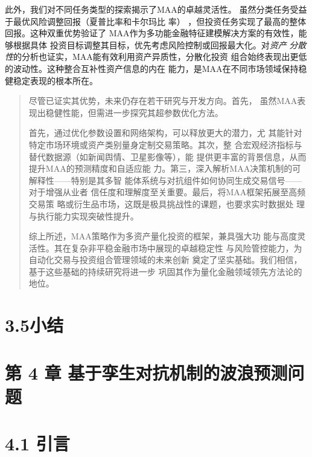 \documentclass[UTF8]{ctexart}
\begin{document}
此外，我们对不同任务类型的探索揭示了MAA的卓越灵活性。
虽然分类任务受益于最优风险调整回报（夏普比率和卡尔玛比 率）
，但投资任务实现了最高的整体回报。这种双重优势验证了
MAA作为多功能金融特征建模解决方案的有效性，能够根据具体
投资目标调整其目标，优先考虑风险控制或回报最大化。对\emph{资产}
\emph{分散性}的分析也证实，MAA能有效利用资产异质性，分散化投资
组合始终表现出更低的波动性。这种整合互补性资产信息的内在
能力，是MAA在不同市场领域保持稳健稳定表现的根本所在。

\begin{quote}
尽管已证实其优势，未来仍存在若干研究与开发方向。首先，
虽然MAA表现出稳健性能，但需进一步探究其超参数优化方法。

首先，通过优化参数设置和网络架构，可以释放更大的潜力，尤
其能针对特定市场环境或资产类别量身定制交易策略。其次，整
合宏观经济指标与替代数据源（如新闻舆情、卫星影像等），能
提供更丰富的背景信息，从而提升MAA的预测精度和自适应能
力。第三，深入解析MAA决策机制的可解释性------特别是其多智
能体系统与对抗组件如何协同生成交易信号------对于增强从业者
信任度和理解度至关重要。最后，将MAA框架拓展至高频交易策
略或衍生品市场，这既是极具挑战性的课题，也要求实时数据处
理与执行能力实现突破性提升。

综上所述，MAA策略作为多资产量化投资的框架，兼具强大功
能与高度灵活性。其在复杂非平稳金融市场中展现的卓越稳定性
与风险管控能力，为自动化交易与投资组合管理领域的未来创新
奠定了坚实基础。我们相信，基于这些基础的持续研究将进一步
巩固其作为量化金融领域领先方法论的地位。
\end{quote}

\section{3.5小结}\label{ux5c0fux7ed3}

\section{第 4 章
基于孪生对抗机制的波浪预测问题}\label{ux7b2c-4-ux7ae0-ux57faux4e8eux5b6aux751fux5bf9ux6297ux673aux5236ux7684ux6ce2ux6d6aux9884ux6d4bux95eeux9898}

\section{4.1 引言}\label{ux5f15ux8a00-1}
\end{document}

